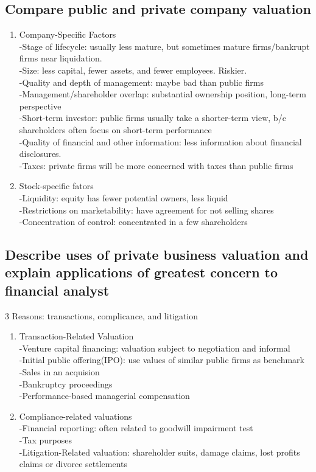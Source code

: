 \documentclass{article}
\newcommand{\be}{\begin{enumerate}}
\newcommand{\ee}{\end{enumerate}}
\begin{document}
\subsection{Compare public and private company valuation}
\be
    \item Company-Specific Factors
        \\-Stage of lifecycle: usually less mature, but sometimes mature firms/bankrupt firms near liquidation.
        \\-Size: less capital, fewer assets, and fewer employees. Riskier.
        \\-Quality and depth of management: maybe bad than public firms
        \\-Management/shareholder overlap: substantial ownership position, long-term perspective
        \\-Short-term investor: public firms usually take a shorter-term view, b/c shareholders
        often focus on short-term performance
        \\-Quality of financial and other information: less information about financial
        disclosures.
        \\-Taxes: private firms will be more concerned with taxes than public firms
    \item Stock-specific fators
        \\-Liquidity: equity has fewer potential owners, less liquid
        \\-Restrictions on marketability: have agreement for not selling shares
        \\-Concentration of control: concentrated in a few shareholders
\ee
\subsection{Describe uses of private business valuation and explain applications
of greatest concern to financial analyst}
3 Reasons: transactions, complicance, and litigation
\be
    \item Transaction-Related Valuation
        \\-Venture capital financing: valuation subject to negotiation and informal
        \\-Initial public offering(IPO): use values of similar public firms as benchmark
        \\-Sales in an acquision
        \\-Bankruptcy proceedings
        \\-Performance-based managerial compensation
    \item Compliance-related valuations
        \\-Financial reporting: often related to goodwill impairment test
        \\-Tax purposes
        \\-Litigation-Related valuation: shareholder suits, damage claims, lost profits claims
        or divorce settlements
\ee
\end{document}
